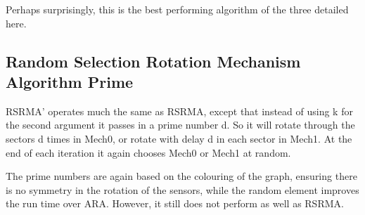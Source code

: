Perhaps surprisingly, this is the best performing algorithm of the three detailed here. 

\subsection{Random Selection Rotation Mechanism Algorithm Prime}
RSRMA' operates much the same as RSRMA, except that instead of using k for the second argument it passes in a prime number d. So it will rotate through the sectors d times in Mech0, or rotate with delay d in each sector in Mech1. At the end of each iteration it again chooses Mech0 or Mech1 at random.

The prime numbers are again based on the colouring of the graph, ensuring there is no symmetry in the rotation of the sensors, while the random element improves the run time over ARA. However, it still does not perform as well as RSRMA.

